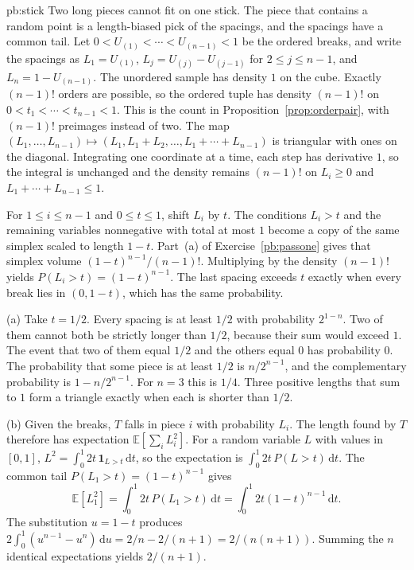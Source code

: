 \begin{solution}{pb:stick}
\idea Two long pieces cannot fit on one stick. The piece that contains a random point is a length-biased pick of the spacings, and the spacings have a common tail.
\writeup Let $0<U_{(1)}<\cdots<U_{(n-1)}<1$ be the ordered breaks, and write the spacings as $L_1=U_{(1)}$, $L_j=U_{(j)}-U_{(j-1)}$ for $2\le j\le n-1$, and $L_n=1-U_{(n-1)}$. The unordered sample has density $1$ on the cube. Exactly $(n-1)!$ orders are possible, so the ordered tuple has density $(n-1)!$ on $0<t_1<\cdots<t_{n-1}<1$. This is the count in Proposition~\ref{prop:orderpair}, with $(n-1)!$ preimages instead of two. The map $(L_1,\ldots,L_{n-1})\mapsto(L_1,L_1+L_2,\ldots,L_1+\cdots+L_{n-1})$ is triangular with ones on the diagonal. Integrating one coordinate at a time, each step has derivative $1$, so the integral is unchanged and the density remains $(n-1)!$ on $L_i\ge0$ and $L_1+\cdots+L_{n-1}\le1$.

For $1\le i\le n-1$ and $0\le t\le1$, shift $L_i$ by $t$. The conditions $L_i>t$ and the remaining variables nonnegative with total at most $1$ become a copy of the same simplex scaled to length $1-t$. Part~(a) of Exercise~\ref{pb:passone} gives that simplex volume $(1-t)^{n-1}/(n-1)!$. Multiplying by the density $(n-1)!$ yields $P(L_i>t)=(1-t)^{n-1}$. The last spacing exceeds $t$ exactly when every break lies in $(0,1-t)$, which has the same probability.

(a) Take $t=1/2$. Every spacing is at least $1/2$ with probability $2^{1-n}$. Two of them cannot both be strictly longer than $1/2$, because their sum would exceed $1$. The event that two of them equal $1/2$ and the others equal $0$ has probability $0$. The probability that some piece is at least $1/2$ is $n/2^{n-1}$, and the complementary probability is $1-n/2^{n-1}$. For $n=3$ this is $1/4$. Three positive lengths that sum to $1$ form a triangle exactly when each is shorter than $1/2$.

(b) Given the breaks, $T$ falls in piece $i$ with probability $L_i$. The length found by $T$ therefore has expectation $\mathbb E[\sum_i L_i^2]$. For a random variable $L$ with values in $[0,1]$, $L^2=\int_0^1 2t\,\mathbf 1_{L>t}\,\mathrm dt$, so the expectation is $\int_0^1 2t\,P(L>t)\,\mathrm dt$. The common tail $P(L_1>t)=(1-t)^{n-1}$ gives
\[
 \mathbb E[L_1^2]=\int_0^1 2t\,P(L_1>t)\,\mathrm dt=\int_0^1 2t(1-t)^{n-1}\,\mathrm dt.
\]
The substitution $u=1-t$ produces $2\int_0^1(u^{n-1}-u^n)\,\mathrm du=2/n-2/(n+1)=2/(n(n+1))$. Summing the $n$ identical expectations yields $2/(n+1)$.
\end{solution}


